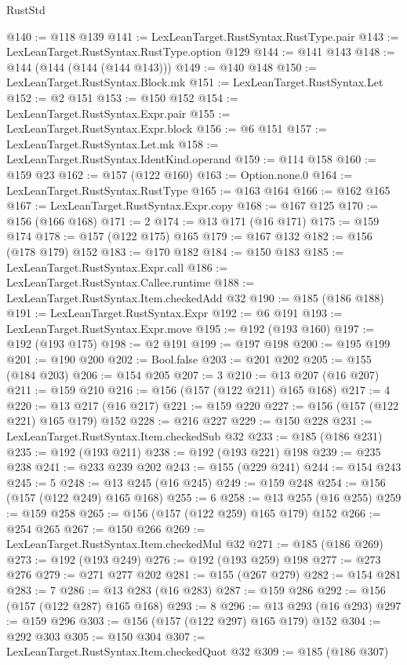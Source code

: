 \begin{lexlean}{RustStd}
\begin{coremodule}
@140 := @118 @139
@141 := LexLeanTarget.RustSyntax.RustType.pair
@143 := LexLeanTarget.RustSyntax.RustType.option @129
@144 := @141 @143
@148 := @144 (@144 (@144 (@144 @143)))
@149 := @140 @148
@150 := LexLeanTarget.RustSyntax.Block.mk
@151 := LexLeanTarget.RustSyntax.Let
@152 := @2 @151
@153 := @150 @152
@154 := LexLeanTarget.RustSyntax.Expr.pair
@155 := LexLeanTarget.RustSyntax.Expr.block
@156 := @6 @151
@157 := LexLeanTarget.RustSyntax.Let.mk
@158 := LexLeanTarget.RustSyntax.IdentKind.operand
@159 := @114 @158
@160 := @159 @23
@162 := @157 (@122 @160)
@163 := Option.none.{0}
@164 := LexLeanTarget.RustSyntax.RustType
@165 := @163 @164
@166 := @162 @165
@167 := LexLeanTarget.RustSyntax.Expr.copy
@168 := @167 @125
@170 := @156 (@166 @168)
@171 := 2
@174 := @13 @171 (@16 @171)
@175 := @159 @174
@178 := @157 (@122 @175) @165
@179 := @167 @132
@182 := @156 (@178 @179) @152
@183 := @170 @182
@184 := @150 @183
@185 := LexLeanTarget.RustSyntax.Expr.call
@186 := LexLeanTarget.RustSyntax.Callee.runtime
@188 := LexLeanTarget.RustSyntax.Item.checkedAdd @32
@190 := @185 (@186 @188)
@191 := LexLeanTarget.RustSyntax.Expr
@192 := @6 @191
@193 := LexLeanTarget.RustSyntax.Expr.move
@195 := @192 (@193 @160)
@197 := @192 (@193 @175)
@198 := @2 @191
@199 := @197 @198
@200 := @195 @199
@201 := @190 @200
@202 := Bool.false
@203 := @201 @202
@205 := @155 (@184 @203)
@206 := @154 @205
@207 := 3
@210 := @13 @207 (@16 @207)
@211 := @159 @210
@216 := @156 (@157 (@122 @211) @165 @168)
@217 := 4
@220 := @13 @217 (@16 @217)
@221 := @159 @220
@227 := @156 (@157 (@122 @221) @165 @179) @152
@228 := @216 @227
@229 := @150 @228
@231 := LexLeanTarget.RustSyntax.Item.checkedSub @32
@233 := @185 (@186 @231)
@235 := @192 (@193 @211)
@238 := @192 (@193 @221) @198
@239 := @235 @238
@241 := @233 @239 @202
@243 := @155 (@229 @241)
@244 := @154 @243
@245 := 5
@248 := @13 @245 (@16 @245)
@249 := @159 @248
@254 := @156 (@157 (@122 @249) @165 @168)
@255 := 6
@258 := @13 @255 (@16 @255)
@259 := @159 @258
@265 := @156 (@157 (@122 @259) @165 @179) @152
@266 := @254 @265
@267 := @150 @266
@269 := LexLeanTarget.RustSyntax.Item.checkedMul @32
@271 := @185 (@186 @269)
@273 := @192 (@193 @249)
@276 := @192 (@193 @259) @198
@277 := @273 @276
@279 := @271 @277 @202
@281 := @155 (@267 @279)
@282 := @154 @281
@283 := 7
@286 := @13 @283 (@16 @283)
@287 := @159 @286
@292 := @156 (@157 (@122 @287) @165 @168)
@293 := 8
@296 := @13 @293 (@16 @293)
@297 := @159 @296
@303 := @156 (@157 (@122 @297) @165 @179) @152
@304 := @292 @303
@305 := @150 @304
@307 := LexLeanTarget.RustSyntax.Item.checkedQuot @32
@309 := @185 (@186 @307)

\end{coremodule}
\end{lexlean}
